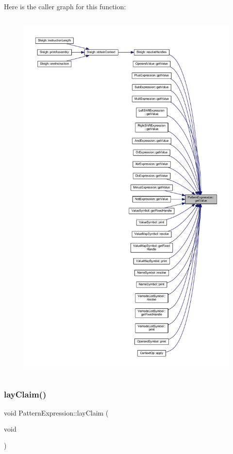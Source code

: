Here is the caller graph for this function\+:
\nopagebreak
\begin{figure}[H]
\begin{center}
\leavevmode
\includegraphics[height=550pt]{class_pattern_expression_a8332c6ea4c5a7e9dfc690df2a6458bb8_icgraph}
\end{center}
\end{figure}
\mbox{\label{class_pattern_expression_a922b328bd6bea398bf294e505378cee0}} 
\subsubsection{\texorpdfstring{layClaim()}{layClaim()}}
{\footnotesize\ttfamily void Pattern\+Expression\+::lay\+Claim (\begin{DoxyParamCaption}\item[{void}]{ }\end{DoxyParamCaption})\hspace{0.3cm}{\ttfamily [inline]}}




